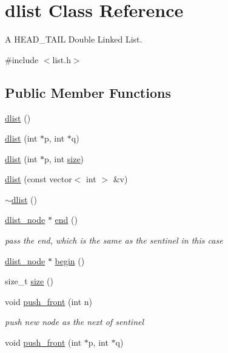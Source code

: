 \hypertarget{classdlist}{\section{dlist Class Reference}
\label{classdlist}
}


A H\-E\-A\-D\-\_\-\-T\-A\-I\-L Double Linked List.  




{\ttfamily \#include $<$list.\-h$>$}

\subsection*{Public Member Functions}
\begin{DoxyCompactItemize}
\item 
\hyperlink{classdlist_a663ac3a48e3d2b426ca2c9a6ee091af3}{dlist} ()
\item 
\hyperlink{classdlist_ab185b9b5e9ff48e7f2f1e3a02af30cfd}{dlist} (int $\ast$p, int $\ast$q)
\item 
\hyperlink{classdlist_a70f123b97444609b43afcaa13153fd8b}{dlist} (int $\ast$p, int \hyperlink{classdlist_a426b9acc0f63b01e5f4551da5c7f1b84}{size})
\item 
\hyperlink{classdlist_ab63bbbb092e126601d75169a60457c04}{dlist} (const vector$<$ int $>$ \&v)
\item 
\hyperlink{classdlist_a5636a21a46af659872820e5bd12b0147}{$\sim$dlist} ()
\item 
\hyperlink{structdlist__node}{dlist\-\_\-node} $\ast$ \hyperlink{classdlist_a1e591a17f27f9b24eec115f5d74cc8d6}{end} ()
\begin{DoxyCompactList}\small\item\em pass the end, which is the same as the sentinel in this case \end{DoxyCompactList}\item 
\hyperlink{structdlist__node}{dlist\-\_\-node} $\ast$ \hyperlink{classdlist_ab8c324da167de0651de38d8302b790fd}{begin} ()
\item 
size\-\_\-t \hyperlink{classdlist_a426b9acc0f63b01e5f4551da5c7f1b84}{size} ()
\item 
void \hyperlink{classdlist_a0e57be4acd4778e5e97acafe702d265d}{push\-\_\-front} (int n)
\begin{DoxyCompactList}\small\item\em push new node as the next of sentinel \end{DoxyCompactList}\item 
void \hyperlink{classdlist_a04759f7a2f3e9026ab1bd17ba44261af}{push\-\_\-front} (int $\ast$p, int $\ast$q)

\end{DoxyCompactItemize}
